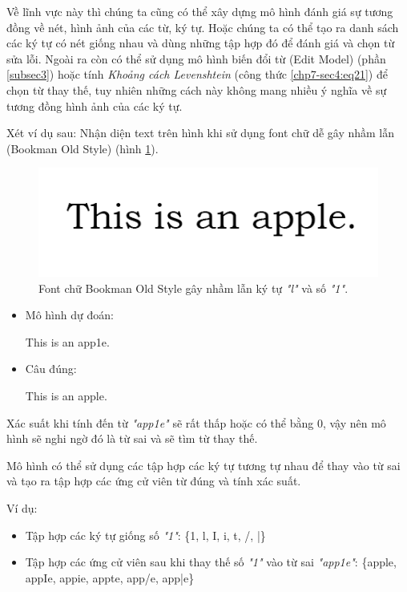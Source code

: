 Về lĩnh vực này thì chúng ta cũng có thể xây dựng mô hình đánh giá sự tương đồng về nét, hình ảnh của các từ, ký tự. Hoặc chúng ta có thể tạo ra danh sách các ký tự có nét giống nhau và dùng những tập hợp đó để đánh giá và chọn từ sửa lỗi. Ngoài ra còn có thể sử dụng mô hình biến đổi từ (Edit Model) (phần \ref{subsec3}) hoặc tính \textit{Khoảng cách Levenshtein} (công thức \ref{chp7-sec4:eq21}) để chọn từ thay thế, tuy nhiên những cách này không mang nhiều ý nghĩa về sự tương đồng hình ảnh của các ký tự.

Xét ví dụ sau: Nhận diện text trên hình khi sử dụng font chữ dễ gây nhầm lẫn (Bookman Old Style) (hình \ref{fig:bookmanoldstyle}).
\begin{figure}[H]
	\centering
		\includegraphics[width=0.5\columnwidth]{books/artificial-neural-network/chapter07/figure-sec4/bookman old style.png}
		\centering
	\caption{Font chữ Bookman Old Style gây nhầm lẫn ký tự \textit{"l"} và số \textit{"1"}.}
	\label{fig:bookmanoldstyle}
\end{figure}

\begin{itemize}
    \item Mô hình dự đoán:
    \begin{center}
    This is an app1e.
    \end{center}
    \item Câu đúng:
    \begin{center}
    This is an apple.
    \end{center}
\end{itemize}

Xác suất khi tính đến từ \textit{"app1e"} sẽ rất thấp hoặc có thể bằng 0, vậy nên mô hình sẽ nghi ngờ đó là từ sai và sẽ tìm từ thay thế.

Mô hình có thể sử dụng các tập hợp các ký tự tương tự nhau để thay vào từ sai và tạo ra tập hợp các ứng cử viên từ đúng và tính xác suất.

Ví dụ:
\begin{itemize}
    \item Tập hợp các ký tự giống số \textit{"1"}: \{1, l, I, i, t, /, |\}
    \item Tập hợp các ứng cử viên sau khi thay thế số \textit{"1"} vào từ sai \textit{"app1e"}: \{apple, appIe, appie, appte, app/e, app|e\}
\end{itemize}

